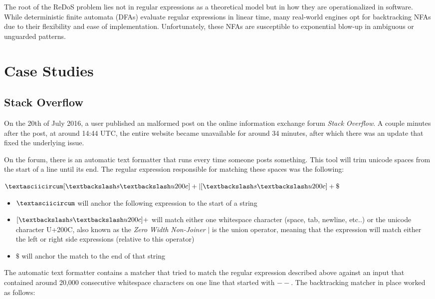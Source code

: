 The root of the ReDoS problem lies not in regular expressions as a theoretical model but in how they are operationalized in software. While deterministic finite automata (DFAs) evaluate regular expressions in linear time, many real-world engines opt for backtracking NFAs due to their flexibility and ease of implementation. Unfortunately, these NFAs are susceptible to exponential blow-up in ambiguous or unguarded patterns.

\section{Case Studies}
\subsection{Stack Overflow}
On the 20th of July 2016, a user published an malformed post on the online information exchange forum \textit{Stack Overflow}. A couple minutes after the post, at around 14:44 UTC, the entire website became unavailable for around 34 minutes, after which there was an update that fixed the underlying issue.

On the forum, there is an automatic text formatter that runs every time someone posts something. This tool will trim unicode spaces from the start of a line until its end. The regular expression responsible for matching these spaces was the following:

\begin{center}
	$\textasciicircum [ \textbackslash s \textbackslash u200c]+|[ \textbackslash s \textbackslash u200c]+\$$
\end{center}

\begin{itemize}
	\item \textbf{$\textasciicircum$} will anchor the following expression to the start of a string
	\item \textbf{$[ \textbackslash s \textbackslash u200c]+$} will match either one whitespace character (space, tab, newline, etc..) or the unicode character U+200C, also known as the \textit{Zero Width Non-Joiner}
	\textit \textbf{$|$} is the union operator, meaning that the expression will match either the left or right side expressions (relative to this operator)
	\item \textbf{$\$$} will anchor the match to the end of that string
\end{itemize}


The automatic text formatter contains a matcher that tried to match the regular expression described above against an input that contained around 20,000 consecutive whitespace characters on one line that started with $--$.
The backtracking matcher in place worked as follows:


